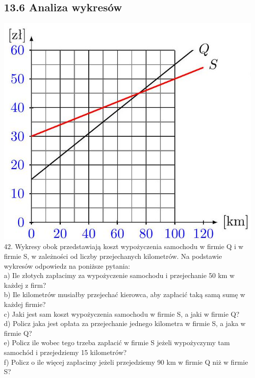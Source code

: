 \documentclass[10pt]{article}
\begin{document}
\subsection*{13.6 Analiza wykresów}
\includegraphics[max width=\textwidth, center]{2024_11_21_e9b4faa005d5be2cc318g-139}\\
42. Wykresy obok przedstawiają koszt wypożyczenia samochodu w firmie Q i w firmie S, w zależności od liczby przejechanych kilometrów. Na podstawie wykresów odpowiedz na poniższe pytania:\\
a) Ile złotych zapłacimy za wypożyczenie samochodu i przejechanie 50 km w każdej z firm?\\
b) Ile kilometrów musiałby przejechać kierowca, aby zapłacić taką samą sumę w każdej firmie?\\
c) Jaki jest sam koszt wypożyczenia samochodu w firmie S, a jaki w firmie Q?\\
d) Policz jaka jest opłata za przejechanie jednego kilometra w firmie S, a jaka w firmie Q?\\
e) Policz ile wobec tego trzeba zapłacić w firmie S jeżeli wypożyczymy tam samochód i przejedziemy 15 kilometrów?\\
f) Policz o ile więcej zapłacimy jeżeli przejedziemy 90 km w firmie Q niż w firmie S?
\end{document}
